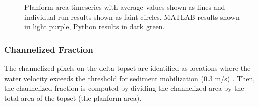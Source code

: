 \begin{figure}[!htbp]
	\caption{Planform area timeseries with average values shown as lines and individual run results shown as faint circles. MATLAB results shown in light purple, Python results in dark green.}
	\label{fig:area}
\end{figure}

\subsubsection{Channelized Fraction}
The channelized pixels on the delta topset are identified as locations where the water velocity exceeds the threshold for sediment mobilization (0.3 m/s) \cite{Liang2016a,Liang2016,Lauzon2018,Lauzon2019}.
Then, the channelized fraction is computed by dividing the channelized area by the total area of the topset (the planform area).

